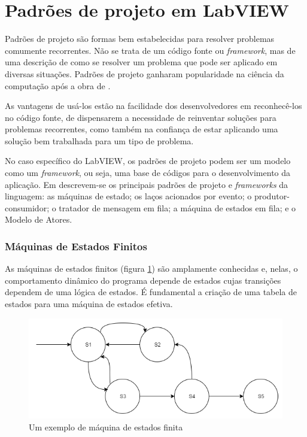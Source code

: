 \section{Padrões de projeto em LabVIEW}

Padrões de projeto são formas bem estabelecidas para resolver problemas comumente recorrentes. Não se trata de um código fonte ou \textit{framework}, mas de uma descrição de como se resolver um problema que pode ser aplicado em diversas situações. Padrões de projeto ganharam popularidade na ciência da computação após a obra de \citet{gamma1994design}. 

As vantagens de usá-los estão na facilidade dos desenvolvedores em reconhecê-los no código fonte, de dispensarem a necessidade de reinventar soluções para problemas recorrentes, como também na confiança de estar aplicando uma solução bem trabalhada para um tipo de problema.

No caso específico do LabVIEW, os padrões de projeto podem ser um modelo como um \textit{framework}, ou seja, uma base de códigos para o desenvolvimento da aplicação. Em \citet{blume2007labview} descrevem-se os principais padrões de projeto e \textit{frameworks} da linguagem: as máquinas de estado; os laços acionados por evento; o produtor-consumidor; o tratador de mensagem em fila; a máquina de estados em fila; e o Modelo de Atores.

\subsubsection{Máquinas de Estados Finitos}
As máquinas de estados finitos (figura \ref{fig:statemachine}) são amplamente conhecidas e, nelas, o comportamento dinâmico do programa depende de estados cujas transições dependem de uma lógica de estados. É fundamental a criação de uma tabela de estados para uma máquina de estados efetiva.

\begin{figure}
    \centering
        \includegraphics[width=0.8\linewidth]{fig/patt/statemachine}
            \caption{Um exemplo de máquina de estados finita}
            \label{fig:statemachine}
\end{figure}

